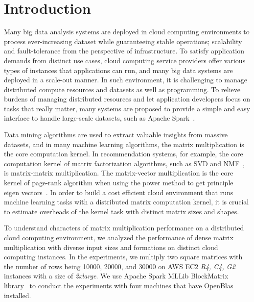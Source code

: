 \documentclass[10pt, conference, compsocconf]{IEEEtran}
\begin{document}
\IEEEpeerreviewmaketitle

\section{Introduction}\label{sec:intro}
Many big data analysis systems are deployed in cloud computing environments to process ever-increasing dataset while guaranteeing stable operations; scalability and fault-tolerance from the perspective of infrastructure. To satisfy application demands from distinct use cases, cloud computing service providers offer various types of instances that applications can run, and many big data systems are deployed in a scale-out manner. In such environment, it is challenging to manage distributed compute resources and datasets as well as programming. To relieve burdens of managing distributed resources and let application developers focus on tasks that really matter, many systems are proposed to provide a simple and easy interface to handle large-scale datasets, such as Apache Spark~\cite{spark}.

Data mining algorithms are used to extract valuable insights from massive datasets, and in many machine learning algorithms, the matrix multiplication is the core computation kernel. In recommendation systems, for example, the core computation kernel of matrix factorization algorithms, such as SVD and NMF~\cite{nmf}, is matrix-matrix multiplication. The matrix-vector multiplication is the core kernel of page-rank algorithm when using the power method to get principle eigen vectors~\cite{pagerank}. In order to build a cost efficient cloud environment that runs machine learning tasks with a distributed matrix computation kernel, it is crucial to estimate overheads of the kernel task with distinct matrix sizes and shapes. 

To understand characters of matrix multiplication performance on a distributed cloud computing environment, we analyzed the performance of dense matrix multiplication with diverse input sizes and formations on distinct cloud computing instances. In the experiments, we multiply two square matrices with the number of rows being 10000, 20000, and 30000 on AWS EC2 \textit{R4, C4, G2} instances with a size of \textit{2xlarge}. We use Apache Spark MLLib BlockMatrix library~\cite{spark-mm} to conduct the experiments with four machines that have OpenBlas installed. 
\end{document}
